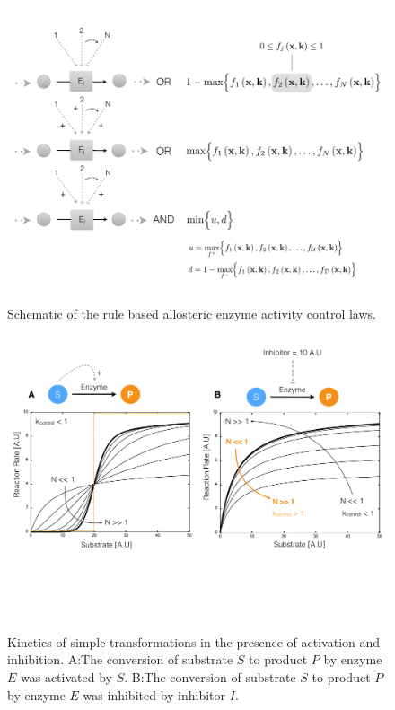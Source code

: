 \documentclass[12pt]{article}
\begin{document}
\begin{figure}
\centering
\includegraphics[width=1.0\textwidth]{./figs/Figure-2-ControlSchematic.pdf}
\caption{Schematic of the rule based allosteric enzyme activity control laws. }\label{fig-control-schematic}
\end{figure}

\clearpage

\begin{figure}
\centering
\includegraphics[width=1.0\textwidth]{./figs/Figure-3-EnzymeKinetics.pdf}
\caption{Kinetics of simple transformations in the presence of activation and inhibition. 
A:The conversion of substrate $S$ to product $P$ by enzyme $E$ was activated by $S$. 
B:The conversion of substrate $S$ to product $P$ by enzyme $E$ was inhibited by inhibitor $I$. 
}\label{fig-kinetics-simulations}
\end{figure}
\end{document}
